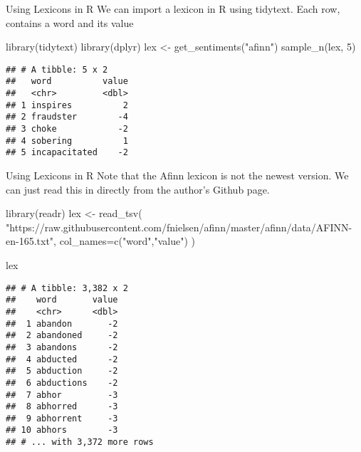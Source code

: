 \documentclass[
  10pt,
  ignorenonframetext,
  aspectratio=169]{beamer}
\newenvironment{Shaded}{\begin{snugshade}}{\end{snugshade}}
\newcommand{\AttributeTok}[1]{\textcolor[rgb]{0.80,0.80,0.80}{#1}}
\newcommand{\DecValTok}[1]{\textcolor[rgb]{0.86,0.86,0.80}{#1}}
\newcommand{\FunctionTok}[1]{\textcolor[rgb]{0.94,0.94,0.56}{#1}}
\newcommand{\NormalTok}[1]{\textcolor[rgb]{0.80,0.80,0.80}{#1}}
\newcommand{\OtherTok}[1]{\textcolor[rgb]{0.94,0.94,0.56}{#1}}
\newcommand{\StringTok}[1]{\textcolor[rgb]{0.80,0.58,0.58}{#1}}
\begin{document}
\begin{frame}[fragile]{Using Lexicons in R}
\protect\hypertarget{using-lexicons-in-r}{}
We can import a lexicon in R using tidytext. Each row, contains a word
and its value

\medskip

\begin{Shaded}
\begin{Highlighting}[]
\FunctionTok{library}\NormalTok{(tidytext)}
\FunctionTok{library}\NormalTok{(dplyr)}
\NormalTok{lex }\OtherTok{\textless{}{-}} \FunctionTok{get\_sentiments}\NormalTok{(}\StringTok{"afinn"}\NormalTok{)}
\FunctionTok{sample\_n}\NormalTok{(lex, }\DecValTok{5}\NormalTok{)}
\end{Highlighting}
\end{Shaded}

\begin{verbatim}
## # A tibble: 5 x 2
##   word          value
##   <chr>         <dbl>
## 1 inspires          2
## 2 fraudster        -4
## 3 choke            -2
## 4 sobering          1
## 5 incapacitated    -2
\end{verbatim}
\end{frame}

\begin{frame}[fragile]{Using Lexicons in R}
\protect\hypertarget{using-lexicons-in-r-1}{}
Note that the Afinn lexicon is not the newest version. We can just read
this in directly from the author's Github page.

\medskip

\begin{Shaded}
\begin{Highlighting}[]
\FunctionTok{library}\NormalTok{(readr)}
\NormalTok{lex }\OtherTok{\textless{}{-}} \FunctionTok{read\_tsv}\NormalTok{(}
  \StringTok{"https://raw.githubusercontent.com/fnielsen/afinn/master/afinn/data/AFINN{-}en{-}165.txt"}\NormalTok{,}
  \AttributeTok{col\_names=}\FunctionTok{c}\NormalTok{(}\StringTok{"word"}\NormalTok{,}\StringTok{"value"}\NormalTok{)}
\NormalTok{)}

\NormalTok{lex}
\end{Highlighting}
\end{Shaded}

\begin{verbatim}
## # A tibble: 3,382 x 2
##    word       value
##    <chr>      <dbl>
##  1 abandon       -2
##  2 abandoned     -2
##  3 abandons      -2
##  4 abducted      -2
##  5 abduction     -2
##  6 abductions    -2
##  7 abhor         -3
##  8 abhorred      -3
##  9 abhorrent     -3
## 10 abhors        -3
## # ... with 3,372 more rows
\end{verbatim}
\end{frame}
\end{document}
